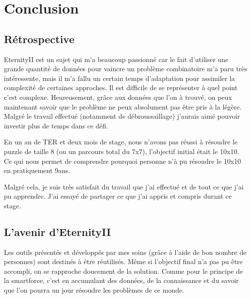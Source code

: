 \section{Conclusion}

\subsection{Rétrospective}

EternityII est un sujet qui m'a beaucoup passionné car le fait d'utiliser une grande quantité de données pour vaincre un problème combinatoire m'a paru très intéressente, mais il m'a fallu un certain temps d'adaptation pour assimiler la complexité de certaines approches. Il est difficile de se représenter à quel point c'est complexe. Heureusement, grâce aux données que l'on à trouvé, on peux maintenant savoir que le problème ne peux absolument pas être pris à la légère. Malgré le travail effectué (notamment de débroussaillage) j'aurais aimé pouvoir investir plus de temps dans ce défi.

En un an de TER et deux mois de stage, nous n'avons pas réussi à résoudre le puzzle de taille 8 (ou un parcours total du 7x7), l'objectif initial était le 10x10. Ce qui nous permet de comprendre pourquoi personne n'à pu résoudre le 10x10 en pratiquement 9ans.

Malgré cela, je suis très satisfait du travail que j'ai effectué et de tout ce que j'ai pu apprendre. J'ai essayé de partager ce que j'ai appris et compris durant ce stage.

\subsection{L'avenir d'EternityII}

Les outils présentés et développés par mes soins (grâce à l'aide de bon nombre de personnes) sont destinés à être réutilisés. Même si l'objectif final n'a pas pu être accompli, on se rapproche doucement de la solution. Comme pour le principe de la smartforce, c'est en accumulant des données, de la connaissance et du savoir que l'on pourra un jour résoudre les problèmes de ce monde.
